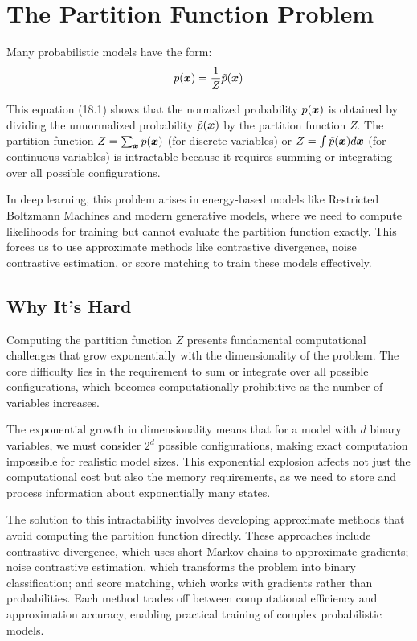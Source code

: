 
\section{The Partition Function Problem }
\label{sec:partition-problem}

Many probabilistic models have the form:
\begin{equation}
p(\boldsymbol{x}) = \frac{1}{Z} \tilde{p}(\boldsymbol{x})
\end{equation}

This equation (18.1) shows that the normalized probability $p(\boldsymbol{x})$ is obtained by dividing the unnormalized probability $\tilde{p}(\boldsymbol{x})$ by the partition function $Z$. The partition function $Z = \sum_{\boldsymbol{x}} \tilde{p}(\boldsymbol{x})$ (for discrete variables) or $Z = \int \tilde{p}(\boldsymbol{x}) d\boldsymbol{x}$ (for continuous variables) is intractable because it requires summing or integrating over all possible configurations.

In deep learning, this problem arises in energy-based models like Restricted Boltzmann Machines and modern generative models, where we need to compute likelihoods for training but cannot evaluate the partition function exactly. This forces us to use approximate methods like contrastive divergence, noise contrastive estimation, or score matching to train these models effectively.

\subsection{Why It's Hard}

Computing the partition function $Z$ presents fundamental computational challenges that grow exponentially with the dimensionality of the problem. The core difficulty lies in the requirement to sum or integrate over all possible configurations, which becomes computationally prohibitive as the number of variables increases.

The exponential growth in dimensionality means that for a model with $d$ binary variables, we must consider $2^d$ possible configurations, making exact computation impossible for realistic model sizes. This exponential explosion affects not just the computational cost but also the memory requirements, as we need to store and process information about exponentially many states.

The solution to this intractability involves developing approximate methods that avoid computing the partition function directly. These approaches include contrastive divergence, which uses short Markov chains to approximate gradients; noise contrastive estimation, which transforms the problem into binary classification; and score matching, which works with gradients rather than probabilities. Each method trades off between computational efficiency and approximation accuracy, enabling practical training of complex probabilistic models.

